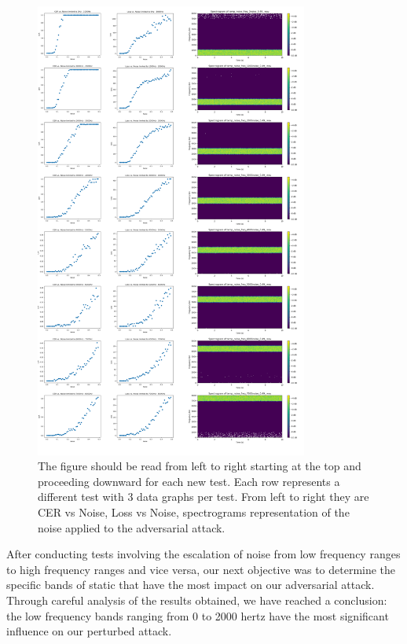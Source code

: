 \documentclass[11pt,a4paper]{article}
\begin{document}
\begin{figure}
  \centering
  \includegraphics[width=0.8\textwidth]{images/WaveBandTestingStatic.png}
  \caption{The figure should be read from left to right starting at the top and proceeding downward for each new test. Each row represents a different test with 3 data graphs per test. From left to right they are CER vs Noise, Loss vs Noise, spectrograms representation of the noise applied to the adversarial attack.}
  \label{fig:WaveBandTestingStatic}
\end{figure}

After conducting tests involving the escalation of noise from low frequency
ranges to high frequency ranges and vice versa, our next objective was to
determine the specific bands of static that have the most impact on our
adversarial attack. Through careful analysis of the results obtained, we have
reached a conclusion: the low frequency bands ranging from 0 to 2000 hertz have
the most significant influence on our perturbed attack.
\end{document}
